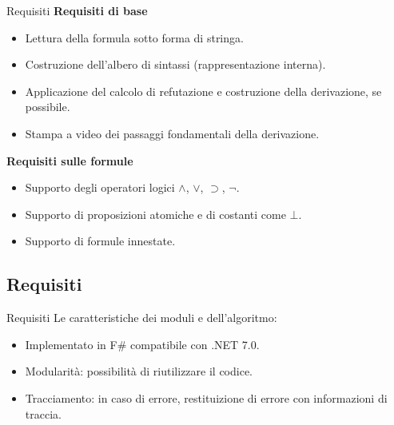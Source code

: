 \documentclass{beamer}
\begin{document}
\begin{darkframes}
\begin{frame}{Requisiti}
        \textbf{Requisiti di base}
        \begin{itemize}
            \item Lettura della formula sotto forma di stringa.
            \item Costruzione dell'albero di sintassi (rappresentazione interna).
            \item Applicazione del calcolo di refutazione e costruzione della derivazione, se possibile.
            \item Stampa a video dei passaggi fondamentali della derivazione.
        \end{itemize}

        \textbf{Requisiti sulle formule}
        \begin{itemize}
            \item Supporto degli operatori logici $\land$, $\lor$, $\supset$, $\neg$.
            \item Supporto di proposizioni atomiche e di costanti come $\bot$.
            \item Supporto di formule innestate.
        \end{itemize}

    \end{frame}

    \subsection{Requisiti}
    \begin{frame}{Requisiti}
        Le caratteristiche dei moduli e dell'algoritmo:
        \begin{itemize}
            \item Implementato in F\# compatibile con .NET 7.0.
            \item Modularità: possibilità di riutilizzare il codice.
            \item Tracciamento: in caso di errore, restituizione di errore con informazioni di traccia.
        \end{itemize}
    \end{frame}


\end{darkframes}
\end{document}
